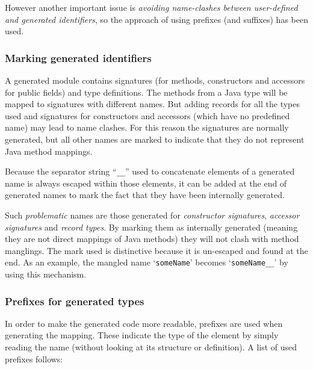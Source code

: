 However another important issue is
\emph{avoiding name-clashes between user-defined and generated identifiers},
so the approach of using prefixes (and suffixes) has been used.


\subsubsection{Marking generated identifiers}

A generated module contains signatures
(for methods, constructors and accessors for public fields)
and type definitions.
The methods from a Java type will be mapped to signatures with different names.
But adding records for all the types used
and signatures for constructors and accessors (which have no predefined name)
may lead to name clashes.
For this reason the signatures are normally generated,
but all other names are marked to indicate that
they do not represent Java method mappings.

Because the separator string ``\verb+__+'' used to concatenate
elements of a generated name
is always escaped within those elements,
it can be added at the end of generated names
to mark the fact that they have been internally generated.

Such \emph{problematic} names are those generated for
\emph{constructor signatures}, \emph{accessor signatures}
and \emph{record types}.
By marking them as internally generated
(meaning they are not direct mappings of Java methods)
they will not clash with method manglings.
The mark used is distinctive because it is un-escaped and found at the end.
As an example, the mangled name `\verb=someName='
becomes `\verb=someName__=' by using this mechanism.


\subsubsection{Prefixes for generated types}

In order to make the generated code more readable,
prefixes are used when generating the mapping.
These indicate the type of the element
by simply reading the name (without looking at its structure or definition).
A list of used prefixes follows:

